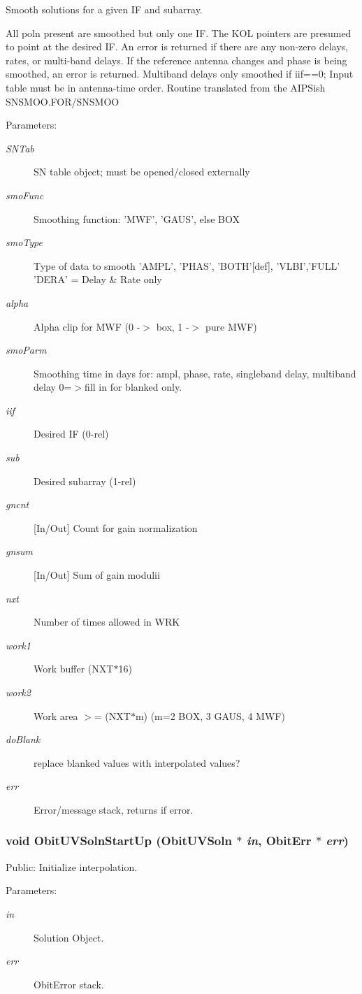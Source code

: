 Smooth solutions for a given IF and subarray. 

All poln present are smoothed but only one IF. The KOL pointers are presumed to point at the desired IF. An error is returned if there are any non-zero delays, rates, or multi-band delays. If the reference antenna changes and phase is being smoothed, an error is returned. Multiband delays only smoothed if iif==0; Input table must be in antenna-time order. Routine translated from the AIPSish SNSMOO.FOR/SNSMOO \begin{Desc}
\item[Parameters:]
\begin{description}
\item[{\em SNTab}]SN table object; must be opened/closed externally \item[{\em smo\-Func}]Smoothing function: 'MWF', 'GAUS', else BOX \item[{\em smo\-Type}]Type of data to smooth 'AMPL', 'PHAS', 'BOTH'[def], 'VLBI','FULL' 'DERA' = Delay \& Rate only \item[{\em alpha}]Alpha clip for MWF (0 -$>$ box, 1 -$>$ pure MWF) \item[{\em smo\-Parm}]Smoothing time in days for: ampl, phase, rate, singleband delay, multiband delay 0=$>$fill in for blanked only. \item[{\em iif}]Desired IF (0-rel) \item[{\em sub}]Desired subarray (1-rel) \item[{\em gncnt}][In/Out] Count for gain normalization \item[{\em gnsum}][In/Out] Sum of gain modulii \item[{\em nxt}]Number of times allowed in WRK \item[{\em work1}]Work buffer (NXT$\ast$16) \item[{\em work2}]Work area $>$= (NXT$\ast$m) (m=2 BOX, 3 GAUS, 4 MWF) \item[{\em do\-Blank}]replace blanked values with interpolated values? \item[{\em err}]Error/message stack, returns if error. \end{description}
\end{Desc}
\subsubsection{\setlength{\rightskip}{0pt plus 5cm}void Obit\-UVSoln\-Start\-Up ({\bf Obit\-UVSoln} $\ast$ {\em in}, {\bf Obit\-Err} $\ast$ {\em err})}\label{ObitUVSoln_8h_a23}


Public: Initialize interpolation. 

\begin{Desc}
\item[Parameters:]
\begin{description}
\item[{\em in}]Solution Object. \item[{\em err}]Obit\-Error stack. \end{description}
\end{Desc}
